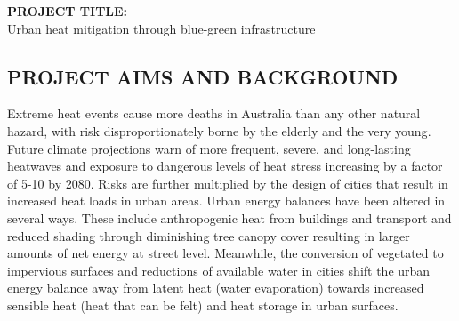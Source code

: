 %
%
%
%
%
%
%
%
%
%
%
%

\noindent \textbf{PROJECT TITLE: }\\ \noindent Urban heat mitigation through blue-green infrastructure

\subsection*{\TitleFont PROJECT AIMS AND BACKGROUND}



Extreme heat events cause more deaths in Australia than any other natural hazard\cite{Coates2014}, with risk disproportionately borne by the elderly and the very young\cite{Nicholls2008}. Future climate projections warn of more frequent, severe, and long-lasting heatwaves\cite{IPCC2013a} and exposure to dangerous levels of heat stress increasing by a factor of 5-10 by 2080\cite{Coffel2018}. Risks are further multiplied by the design of cities\cite{Coutts2012,Martilli2020} that result in increased heat loads in urban areas. Urban energy balances have been altered in several ways\cite{Oke1982}. These include anthropogenic heat from buildings and transport and reduced shading through diminishing tree canopy cover resulting in larger amounts of net energy at street level. Meanwhile, the conversion of vegetated to impervious surfaces and reductions of available water in cities shift the urban energy balance away from latent heat (water evaporation) towards increased sensible heat (heat that can be felt) and heat storage in urban surfaces. 

